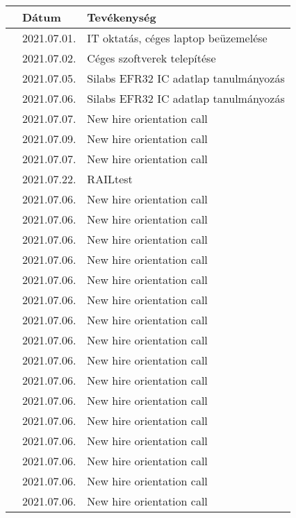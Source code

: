 \documentclass[10pt,a4paper,oneside]{report}
\newcounter{magicrownumbers}
\newcommand\rownum{\stepcounter{magicrownumbers}\arabic{magicrownumbers}}
\begin{document}
\begin{table}[h]
	\centering
	\begin{tabular}{| c | p{3 cm} | p{10 cm} |}
	\hline
	 & Dátum & Tevékenység \\ \hline \hline
	\rownum & 2021.07.01. & IT oktatás, céges laptop beüzemelése \\ \hline
	\rownum & 2021.07.02. & Céges szoftverek telepítése \\ \hline
	\rownum & 2021.07.05. & Silabs EFR32 IC adatlap tanulmányozás \\ \hline
	\rownum & 2021.07.06. & Silabs EFR32 IC adatlap tanulmányozás \\ \hline
	\rownum & 2021.07.07. & New hire orientation call \\ \hline
	\rownum & 2021.07.09. & New hire orientation call \\ \hline
	\rownum & 2021.07.07. & New hire orientation call \\ \hline
	\rownum & 2021.07.22. & RAILtest \\ \hline
	\rownum & 2021.07.06. & New hire orientation call \\ \hline
	\rownum & 2021.07.06. & New hire orientation call \\ \hline
	\rownum & 2021.07.06. & New hire orientation call \\ \hline
	\rownum & 2021.07.06. & New hire orientation call \\ \hline
	\rownum & 2021.07.06. & New hire orientation call \\ \hline
	\rownum & 2021.07.06. & New hire orientation call \\ \hline
	\rownum & 2021.07.06. & New hire orientation call \\ \hline
	\rownum & 2021.07.06. & New hire orientation call \\ \hline
	\rownum & 2021.07.06. & New hire orientation call \\ \hline
	\rownum & 2021.07.06. & New hire orientation call \\ \hline
	\rownum & 2021.07.06. & New hire orientation call \\ \hline
	\rownum & 2021.07.06. & New hire orientation call \\ \hline
	\rownum & 2021.07.06. & New hire orientation call \\ \hline
	\rownum & 2021.07.06. & New hire orientation call \\ \hline
	\rownum & 2021.07.06. & New hire orientation call \\ \hline
	\rownum & 2021.07.06. & New hire orientation call \\ \hline

\end{tabular}
\end{table}
\end{document}
